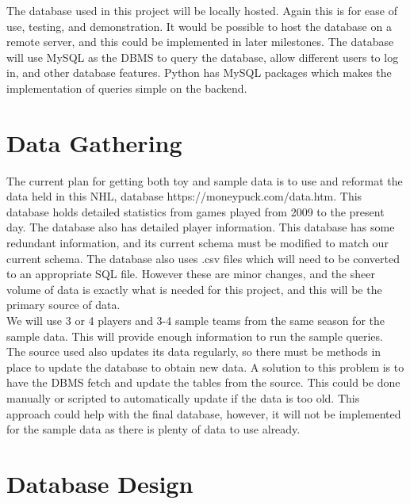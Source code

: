 \documentclass[11pt]{article}
\begin{document}
The database used in this project will be locally hosted. Again this is for ease of use, testing, and demonstration. It would be possible to host the database on a remote server, and this could be implemented in later milestones. The database will use MySQL as the DBMS to query the database, allow different users to log in, and other database features. Python has MySQL packages which makes the implementation of queries simple on the backend. \\ 

\section{Data Gathering}
The current plan for getting both toy and sample data is to use and reformat the data held in this NHL, database https://moneypuck.com/data.htm. This database holds detailed statistics from games played from 2009 to the present day. The database also has detailed player information. This database has some redundant information, and its current schema must be modified to match our current schema. The database also uses .csv files which will need to be converted to an appropriate SQL file. However these are minor changes, and the sheer volume of data is exactly what is needed for this project, and this will be the primary source of data. \\

We will use 3 or 4 players and 3-4 sample teams from the same season for the sample data. This will provide enough information to run the sample queries. \\

The source used also updates its data regularly, so there must be methods in place to update the database to obtain new data. A solution to this problem is to have the DBMS fetch and update the tables from the source. This could be done manually or scripted to automatically update if the data is too old. This approach could help with the final database, however, it will not be implemented for the sample data as there is plenty of data to use already. \\


\section{Database Design}
\end{document}
